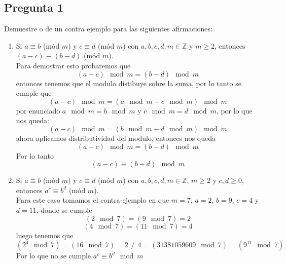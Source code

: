 \documentclass[letter]{article}
\begin{document}
	
	\begin{pregunta}{1} %
		\section*{Pregunta 1}
		Demuestre o de un contra ejemplo para las siguientes afirmaciones:
		\begin{enumerate}
		\item Si $a\equiv b$ (mód $m$) y $c\equiv d$ (mód $m$) con $a,b,c,d,m \in \mathbb{Z}$ y $m\geq 2$, entonces $(a-c)\equiv (b-d)$ (mód $m$).\\
		
		Para demostrar esto probaremos que 
		$$ (a-c)\mod m = (b-d) \mod m$$
		entonces tenemos que el modulo distibuye sobre la suma, por lo tanto se cumple que 
		$$ (a-c)\mod m = (a\mod m - c\mod m)\mod m$$
		por enunciado $a\mod m = b\mod m$ y $c\mod m = d\mod m$, por lo que nos queda:
		$$(a-c)\mod m = (b\mod m - d\mod m)\mod m$$
		ahora aplicamos distributividad del modulo, entonces nos queda
		$$(a-c)\mod m = (b-d)\mod m$$
		Por lo tanto 
		$$(a-c) \equiv (b-d)\mod m$$
		\item Si $a\equiv b$ (mód $m$) y $c\equiv d$ (mód $m$) con $a,b,c,d,m\in \mathbb{Z}$, $m\geq 2$ y $c,d\geq 0$, entonces $a^{c}\equiv b^{d}$ (mód $m$).\\
		
		Para este caso tomamos el contra-ejemplo en que $m=7$, $a=2$, $b=9$, $c=4$ y $d=11$, donde se cumple
		$$ (2 \mod 7) = (9\mod 7) = 2$$
		$$ (4\mod 7) = (11\mod 7) = 4$$
		luego tenemos que 
		$$(2^{4}\mod 7) = (16 \mod 7) = 2 \neq 4=(31381059609\mod 7)=(9^{11}\mod 7) $$
		Por lo que no se cumple $a^{c}\equiv b^{d}\mod m$
		\end{enumerate}
		
	\end{pregunta}
	
\end{document}
